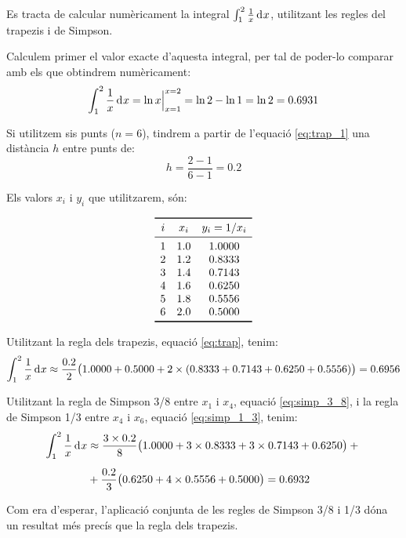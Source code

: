 \begin{exemple}
    Es tracta de calcular numèricament la integral $\int_1^2 \frac{1}{x} \diff x$, utilitzant les regles del trapezis i de Simpson.

    Calculem primer el valor exacte d'aquesta integral, per tal de poder-lo comparar amb els que obtindrem  numèricament:
    \[
      \int_1^2 \frac{1}{x} \diff x = \ln x \Bigr|_{x=1}^{x=2} = \ln 2 - \ln 1 = \ln 2 = \num{0,6931}
    \]

    Si utilitzem sis punts ($n=6$), tindrem a partir de l'equació \eqref{eq:trap_1} una distància $h$ entre punts de:
    \[
        h = \frac{2-1}{6-1} = \num{0,2}
    \]

    Els valors $x_i$ i $y_i$ que utilitzarem, són:
    \vspace{-8mm}
    \begin{center}
        \[\begin{array}{ccc}
           \toprule[1pt]
              i & x_i  & y_i = 1/x_i \\
           \midrule
              1 & \num{1,0} & \num{1,0000} \\
              2 & \num{1,2} & \num{0,8333} \\
              3 & \num{1,4} & \num{0,7143} \\
              4 & \num{1,6} & \num{0.6250} \\
              5 & \num{1,8} & \num{0.5556} \\
              6 & \num{2,0} & \num{0,5000} \\
           \bottomrule[1pt]
        \end{array} \]
    \end{center}

    Utilitzant la regla dels trapezis, equació \eqref{eq:trap}, tenim:
    \[
        \int_1^2 \frac{1}{x} \diff x \approx \frac{\num{0,2}}{2} \big(\num{1,0000}+\num{0,5000} +2 \times(\num{0,8333}+ \num{0,7143} +
        \num{0,6250} + \num{0,5556}) \big) = \num{0,6956}
    \]

    Utilitzant la regla de Simpson 3/8 entre $x_1$ i $x_4$, equació \eqref{eq:simp_3_8}, i la  regla de Simpson 1/3 entre $x_4$ i $x_6$, equació \eqref{eq:simp_1_3}, tenim:
    \[\begin{split}
        \int_1^2 \frac{1}{x} \diff x &\approx \frac{3\times\num{0,2}}{8} \big(\num{1,0000}+3\times\num{0,8333} +3\times \num{0,7143} +
        \num{0,6250} \big) +{}\\[0.5em]
        {}&+ \frac{\num{0,2}}{3} \big(\num{0,6250} +4\times \num{0,5556} + \num{0,5000} \big)
        = \num{0,6932}
    \end{split}\]

    Com era d'esperar, l'aplicació conjunta de les regles de Simpson 3/8 i 1/3 dóna un resultat més precís que la regla dels trapezis.
\end{exemple}


